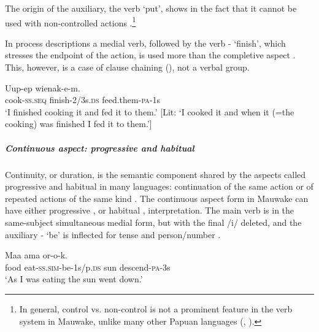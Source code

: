 The origin of the auxiliary, the verb `put', shows in the fact that it cannot be used with non-controlled actions  .\footnote{In general, control vs. non-control is not a prominent feature in the verb system in Mauwake, unlike many other Papuan languages (\citealt[127]{Foley1986}, \citealt[128]{Reesink1987}).}

\z

In process descriptions a medial verb, followed by the verb - `finish', which stresses the endpoint of the action, is used more than the completive aspect  . This, however, is a case of clause chaining (), not a verbal group.

\ea%
\label{ex:3:x366}
\gll Uup-ep  wienak-e-m. \\
cook-\textsc{ss}.\textsc{seq} finish-2/3s.\textsc{ds} feed.them-\textsc{pa}-1s\\
\glt`I finished cooking it and fed it to them.' [Lit: `I cooked it and when it (=the cooking) was finished I fed it to them.']
\z

\subparagraph{Continuous aspect: progressive and habitual} \label{sec:3.8.5.1.1.2}

Continuity, or duration, is the semantic component shared by the aspects called progressive and habitual in many languages: continuation of the same action or of repeated actions of the same kind \citep[26]{Comrie1976}. The continuous aspect form in Mauwake can have either progressive ,  or habitual ,  interpretation. The main verb is in the same-subject simultaneous medial form, but with the final /i/ deleted, and the auxiliary - `be' is inflected for tense and person/number . 

\ea%
\label{ex:3:x349}
\gll Maa  ama or-o-k. \\
food eat-\textsc{ss}.\textsc{sim}-be-1s/p.\textsc{ds} sun descend-\textsc{pa}-3s \\
\glt`As I was eating the sun went down.'
\z

